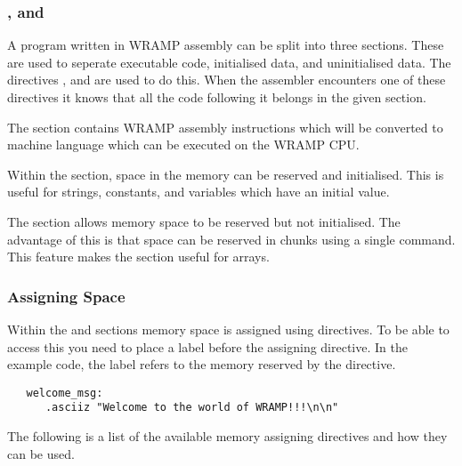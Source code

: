 \subsubsection{\text, \data and \bss}
A program written in WRAMP assembly can be split into three sections.
These are used to seperate executable code, initialised data, and
uninitialised data. The directives \text, \data and \bss are used to
do this. When the assembler encounters one of these directives it
knows that all the code following it belongs in the given section.

The \text section contains WRAMP assembly instructions which will be
converted to machine language which can be executed on the WRAMP CPU.

Within the \data section, space in the memory can be reserved and
initialised. This is useful for strings, constants, and variables
which have an initial value.

The \bss section allows memory space to be reserved but not initialised.
The advantage of this is that space can be reserved in chunks using a single
command. This feature makes the \bss section useful for arrays.

\subsubsection{Assigning Space}
Within the \data and \bss sections memory space is assigned using directives. 
To be able to access this you need to place a label before the assigning
directive. In the example code, the label  refers to the
memory reserved by the \asciiz directive.

\begin{verbatim}
   welcome_msg:
      .asciiz "Welcome to the world of WRAMP!!!\n\n"
\end{verbatim}

The following is a list of the available memory assigning directives
and how they can be used.

